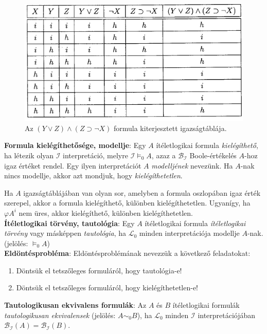 \documentclass[margin=0px]{article}
\begin{document}
	\begin{figure}[H]
		\centering
		\includegraphics[width=0.5\linewidth]{img/kiterjigaztabla}
		\caption{Az $(Y \vee Z) \wedge (Z \supset \neg X)$ formula kiterjesztett igazságtáblája.}
		\label{fig:kiterjigaztabla}
	\end{figure}
	
	\noindent \textbf{Formula kielégíthetősége, modellje}: Egy $A$ ítéletlogikai formula \textit{kielégíthető}, ha létezik olyan  $\mathcal{I}$
	interpretáció, melyre $\mathcal{I} \models_{0} A$, azaz a $\mathcal{B}_{\mathcal{I}}$ Boole-értékelés $A$-hoz igaz értéket rendel. Egy
	ilyen interpretációt $A$ \textit{modelljének} nevezünk. Ha $A$-nak nincs modellje, akkor azt mondjuk, hogy \textit{kielégíthetetlen}.
	
	Ha $A$ igazságtáblájában van olyan sor, amelyben a formula oszlopában igaz érték szerepel, akkor a formula kielégíthető, különben kielégíthetetlen. Ugyanígy, ha $\varphi A^{i}$ nem üres, akkor kielégíthető, különben kielégíthetetlen.\\
	
	\noindent \textbf{Ítéletlogikai törvény, tautológia}: Egy $A$ ítéletlogikai formula \textit{ítéletlogikai törvény} vagy másképpen \textit{tautológia}, ha $\mathcal{L}_{0}$ minden interpretációja modellje $A$-nak. (jelölés: $\models_{0} A$)\\
	
	\noindent \textbf{Eldöntésprobléma}: Eldöntésproblémának nevezzük a következő feladatokat:
	\begin{enumerate}
		\item	Döntsük el tetszőleges formuláról, hogy tautológia-e!
		
		\item	Döntsük el tetszőleges formuláról, hogy kielégíthetetlen-e!
	\end{enumerate}
	
	\noindent \textbf{Tautologikusan ekvivalens formulák}: Az $A$ és $B$ ítéletlogikai formulák \textit{tautologikusan ekvivalensek} (jelölés: $A \sim _{0} B$), ha $\mathcal{L}_{0}$ minden $\mathcal{I}$ interpretációjában $\mathcal{B}_{\mathcal{I}}(A)=\mathcal{B}_{\mathcal{I}}(B)$.\\
	
\end{document}
